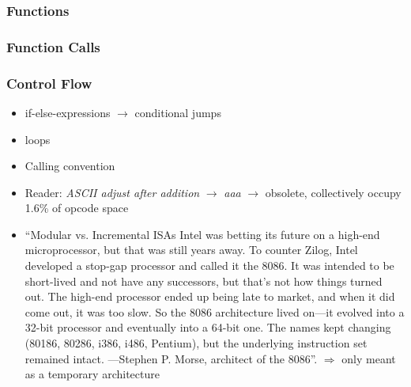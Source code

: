 \subsubsection{Functions}

\subsubsection{Function Calls}


\subsubsection{Control Flow}

\begin{itemize}
	\item if-else-expressions $\rightarrow$ conditional jumps
	\item loops
\end{itemize}

\begin{itemize}
	\item Calling convention
	\item \riscv{} Reader: \emph{ASCII adjust after addition} $\rightarrow$ \emph{aaa} $\rightarrow$ obsolete, collectively occupy 1.6\% of opcode space\cite[p.~4]{Patterson2017}
	\item
	      \enquote{Modular vs. Incremental ISAs Intel was betting its future on a high-end microprocessor, but that was still years away.
		      To counter Zilog, Intel developed a stop-gap processor and called it the 8086. It was intended to be short-lived and not have any successors,
		      but that’s not how things turned out. The high-end processor ended up being late to market, and when it did come out, it was too slow.
		      So the 8086 architecture lived on—it evolved into a 32-bit processor and eventually into a 64-bit one.
		      The names kept changing (80186, 80286, i386, i486, Pentium), but the underlying instruction set remained intact. —Stephen P. Morse, architect of the 8086}\cite{Morse2017}.
	      $\Rightarrow$ only meant as a temporary architecture
\end{itemize}
